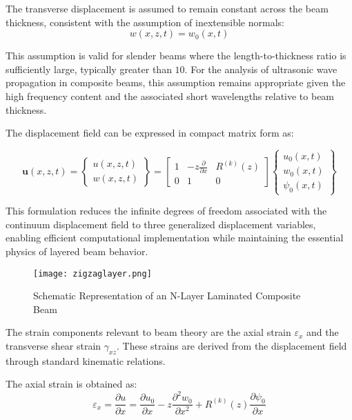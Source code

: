 \documentclass[12pt,a4paper]{report}
\begin{document}
The transverse displacement is assumed to remain constant across the beam thickness, consistent with the assumption of inextensible normals:
\begin{equation}
   w(x,z,t) = w_0(x,t) 
\end{equation}


This assumption is valid for slender beams where the length-to-thickness ratio is sufficiently large, typically greater than $10$. For the analysis of ultrasonic wave propagation in composite beams, this assumption remains appropriate given the high frequency content and the associated short wavelengths relative to beam thickness.

The displacement field can be expressed in compact matrix form as:

\begin{equation}
\mathbf{u}(x,z,t) = 
\begin{Bmatrix}
u(x,z,t) \\
w(x,z,t)
\end{Bmatrix}
=
\begin{bmatrix}
1 & -z\frac{\partial }{\partial x} & R^{(k)}(z) \\
0 & 1 & 0
\end{bmatrix}
\begin{Bmatrix}
u_0(x,t) \\
w_0(x,t) \\
\psi_0(x,t)
\end{Bmatrix}
\end{equation}


This formulation reduces the infinite degrees of freedom associated with the continuum displacement field to three generalized displacement variables, enabling efficient computational implementation while maintaining the essential physics of layered beam behavior.

\begin{figure}[htbp]
\centering
\texttt{[image: zigzaglayer.png]}
\caption{Schematic Representation of an
N-Layer Laminated Composite Beam}
\label{fig:zigzag_layer}
\end{figure}

The strain components relevant to beam theory are the axial strain $\varepsilon_x$ and the transverse shear strain $\gamma_{xz}$. These strains are derived from the displacement field through standard kinematic relations.

The axial strain is obtained as:
\begin{equation}
\varepsilon_x = \frac{\partial u}{\partial x} 
= \frac{\partial u_0}{\partial x} 
- z \frac{\partial^2 w_0}{\partial x^2} 
+ R^{(k)}(z) \frac{\partial \psi_0}{\partial x}
\end{equation}
\end{document}
